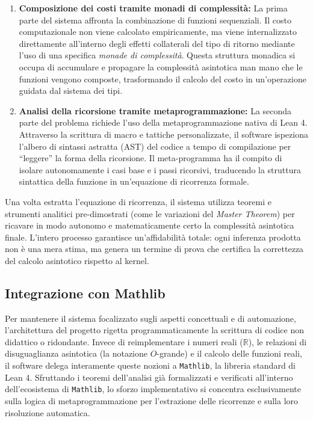 \begin{enumerate}
    \item \textbf{Composizione dei costi tramite monadi di complessità:} 
        La prima parte del sistema affronta la combinazione di funzioni sequenziali. Il costo computazionale non viene calcolato empiricamente, ma viene 
        internalizzato direttamente all'interno degli effetti collaterali del tipo di ritorno mediante l'uso di una specifica \emph{monade di complessità}. 
        Questa struttura monadica si occupa di accumulare e propagare la complessità asintotica man mano che le funzioni vengono composte, trasformando 
        il calcolo del costo in un'operazione guidata dal sistema dei tipi.
    
    \item \textbf{Analisi della ricorsione tramite metaprogrammazione:} 
        La seconda parte del problema richiede l'uso della metaprogrammazione nativa di Lean 4. Attraverso la scrittura di macro e tattiche personalizzate, 
        il software ispeziona l'albero di sintassi astratta (AST) del codice a tempo di compilazione per ``leggere'' la forma della ricorsione. Il meta-programma 
        ha il compito di isolare autonomamente i casi base e i passi ricorsivi, traducendo la struttura sintattica della funzione in un'equazione di ricorrenza formale.
\end{enumerate}
Una volta estratta l'equazione di ricorrenza, il sistema utilizza teoremi e strumenti analitici pre-dimostrati (come le variazioni del \textit{Master Theorem}) per ricavare 
in modo autonomo e matematicamente certo la complessità asintotica finale. L'intero processo garantisce un'affidabilità totale: ogni inferenza prodotta non è una mera stima, 
ma genera un termine di prova che certifica la correttezza del calcolo asintotico rispetto al kernel.

\subsection{Integrazione con Mathlib}
Per mantenere il sistema focalizzato sugli aspetti concettuali e di automazione, l'architettura del progetto rigetta programmaticamente la scrittura di codice non didattico 
o ridondante. Invece di reimplementare i numeri reali ($\mathbb{R}$), le relazioni di disuguaglianza asintotica (la notazione $O$-grande) e il calcolo delle funzioni reali, 
il software delega interamente queste nozioni a \texttt{Mathlib}, la libreria standard di Lean 4. Sfruttando i teoremi dell'analisi già formalizzati e verificati all'interno 
dell'ecosistema di \texttt{Mathlib}, lo sforzo implementativo si concentra esclusivamente sulla logica di metaprogrammazione per l'estrazione delle ricorrenze e sulla loro 
risoluzione automatica.

